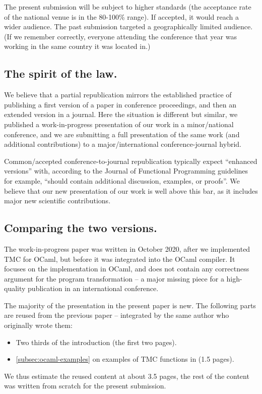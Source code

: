 The present submission will be subject to higher standards
(the acceptance rate of the national venue is in the
80-100\% range). If accepted, it would reach a wider audience. The
past submission targeted a geographically limited audience. (If we
remember correctly, everyone attending the conference that year was
working in the same country it was located in.)

\subsection{The spirit of the law.}

We believe that a partial republication mirrors the established
practice of publishing a first version of a paper in conference
proceedings, and then an extended version in a journal. Here the
situation is different but similar, we published a work-in-progress
presentation of our work in a minor/national conference, and we are
submitting a full presentation of the same work
(and additional contributions) to a major/international
conference-journal hybrid.

Common/accepted conference-to-journal republication typically expect
``enhanced versions'' with, according to the Journal of Functional
Programming guidelines for example, ``should contain additional
discussion, examples, or proofs''. We believe that our new
presentation of our work is well above this bar, as it includes major
new scientific contributions.

\subsection{Comparing the two versions.}

The work-in-progress paper was written in October 2020, after we
implemented TMC for OCaml, but before it was integrated into the OCaml
compiler. It focuses on the implementation in OCaml, and does not
contain any correctness argument for the program transformation --
a major missing piece for a high-quality publication in an
international conference.

The majority of the presentation in the present paper is new. The
following parts are reused from the previous paper --
integrated by the same author who originally wrote them:
\begin{itemize}
\item Two thirds of the introduction (the first two pages).
\item \cref{subsec:ocaml-examples} on examples of TMC functions in
  \OCaml (1.5 pages).
\end{itemize}
We thus estimate the reused content at about 3.5 pages, the rest of
the content was written from scratch for the present submission.

